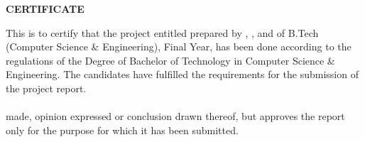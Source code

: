 \begin{adjustwidth}{0.25in}{0.25in}

\vspace*{\fill}

  \begin{center}
\LARGE {\bf \uppercase{Certificate}}
\end{center}

\vspace{1\baselineskip}

\noindent
This is to certify that the project entitled  prepared by ,  ,  and  of B.Tech (Computer Science \& Engineering), Final Year, has been done according to the regulations of the Degree of
Bachelor of Technology in Computer Science \& Engineering. The candidates have
fulfilled the requirements for the submission of the project report.\\\\
 made, opinion expressed or conclusion drawn thereof, but approves the report only for the purpose for which it has been submitted.

\hspace{\baselineskip}

\vspace{3\baselineskip}
\noindent
{}


\end{adjustwidth}
